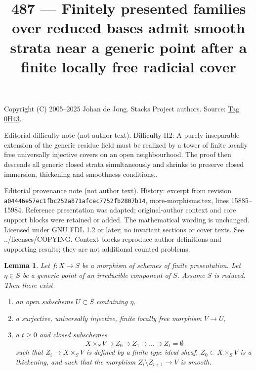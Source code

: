 \documentclass{amsart}
\theoremstyle{plain}
\newtheorem{lemma}[subsection]{Lemma}
\theoremstyle{definition}
\theoremstyle{remark}
\numberwithin{equation}{subsection}
\begin{document}
\title[Stacks Project, Tag 0H43]{487 --- Finitely presented families over reduced bases admit smooth strata near a generic point after a finite locally free radicial cover}
\maketitle
\noindent Copyright (C) 2005--2025 Johan de Jong. Stacks Project authors. Source: \href{https://stacks.math.columbia.edu/tag/0H43}{Tag 0H43}.

\noindent Editorial difficulty note (not author text). Difficulty H2: A purely inseparable extension of the generic residue field must be realized by a tower of finite locally free universally injective covers on an open neighbourhood. The proof then descends all generic closed strata simultaneously and shrinks to preserve closed immersion, thickening and smoothness conditions..

\noindent Editorial provenance note (not author text). History: excerpt from revision \texttt{a0444\allowbreak 6e57e\allowbreak c1fbc\allowbreak 252a8\allowbreak 71afc\allowbreak ec775\allowbreak 2fb28\allowbreak 07b14}, more-morphisms.tex, lines 15885--15984. Reference presentation was adapted; original-author context and core support blocks were retained or added. The mathematical wording is unchanged. Licensed under GNU FDL 1.2 or later; no invariant sections or cover texts. See ../licenses/COPYING. Context blocks reproduce author definitions and supporting results; they are not additional counted problems.

\begin{lemma}
\label{lemma-smoothness-stratification-at-generic-point}
Let $f : X \to S$ be a morphism of schemes of finite presentation.
Let $\eta \in S$ be a generic point of an irreducible component of $S$.
Assume $S$ is reduced. Then there exist
\begin{enumerate}
\item an open subscheme $U \subset S$ containing $\eta$,
\item a surjective, universally injective, finite locally free
morphism $V \to U$,
\item a $t \geq 0$ and closed subschemes
$$
X \times_S V \supset Z_0 \supset Z_1 \supset \ldots \supset Z_t = \emptyset
$$
such that $Z_i \to X \times_S V$ is defined by a finite type ideal sheaf,
$Z_0 \subset X \times_S V$ is a thickening, and such that the morphism
$Z_i \setminus Z_{i + 1} \to V$ is smooth.
\end{enumerate}
\end{lemma}
\end{document}
